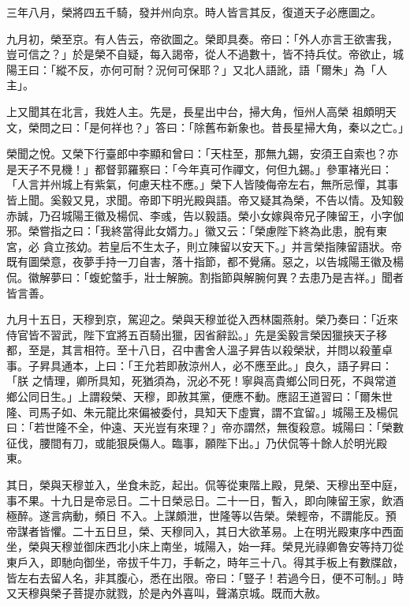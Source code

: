 \begin{pinyinscope}
 三年八月，榮將四五千騎，發并州向京。時人皆言其反，復道天子必應圖之。



 九月初，榮至京。有人告云，帝欲圖之。榮即具奏。帝曰：「外人亦言王欲害我，豈可信之？」於是榮不自疑，每入謁帝，從人不過數十，皆不持兵仗。帝欲止，城陽王曰：「縱不反，亦何可耐？況何可保耶？」又北人語訛，語「爾朱」為「人主」。



 上又聞其在北言，我姓人主。先是，長星出中台，掃大角，恒州人高榮
 祖頗明天文，榮問之曰：「是何祥也？」答曰：「除舊布新象也。昔長星掃大角，秦以之亡。」



 榮聞之悅。又榮下行臺郎中李顯和曾曰：「天柱至，那無九錫，安須王自索也？亦是天子不見機！」都督郭羅察曰：「今年真可作禪文，何但九錫。」參軍褚光曰：「人言并州城上有紫氣，何慮天柱不應。」榮下人皆陵侮帝左右，無所忌憚，其事皆上聞。奚毅又見，求聞。帝即下明光殿與語。帝又疑其為榮，不告以情。及知毅赤誠，乃召城陽王徽及楊侃、李彧，告以毅語。榮小女嫁與帝兄子陳留王，小字伽邪。榮嘗指之曰：「我終當得此女婿力。」徽又云：「榮慮陛下終為此患，脫有東宮，必
 貪立孩幼。若皇后不生太子，則立陳留以安天下。」并言榮指陳留語狀。帝既有圖榮意，夜夢手持一刀自害，落十指節，都不覺痛。惡之，以告城陽王徽及楊侃。徽解夢曰：「蝮蛇螫手，壯士解腕。割指節與解腕何異？去患乃是吉祥。」聞者皆言善。



 九月十五日，天穆到京，駕迎之。榮與天穆並從入西林園燕射。榮乃奏曰：「近來侍官皆不習武，陛下宜將五百騎出獵，因省辭訟。」先是奚毅言榮因獵挾天子移都，至是，其言相符。至十八日，召中書舍人溫子昇告以殺榮狀，并問以殺董卓事。子昇具通本，上曰：「王允若即赦涼州人，必不應至此。」良久，語子昇曰：「朕
 之情理，卿所具知，死猶須為，況必不死！寧與高貴鄉公同日死，不與常道鄉公同日生。」上謂殺榮、天穆，即赦其黨，便應不動。應詔王道習曰：「爾朱世隆、司馬子如、朱元龍比來偏被委付，具知天下虛實，謂不宜留。」城陽王及楊侃曰：「若世隆不全，仲遠、天光豈有來理？」帝亦謂然，無復殺意。城陽曰：「榮數征伐，腰間有刀，或能狠戾傷人。臨事，願陛下出。」乃伏侃等十餘人於明光殿東。



 其日，榮與天穆並入，坐食未訖，起出。侃等從東階上殿，見榮、天穆出至中庭，事不果。十九日是帝忌日。二十日榮忌日。二十一日，暫入，即向陳留王家，飲酒極醉。遂言病動，頻日
 不入。上謀頗泄，世隆等以告榮。榮輕帝，不謂能反。預帝謀者皆懼。二十五日旦，榮、天穆同入，其日大欲革易。上在明光殿東序中西面坐，榮與天穆並御床西北小床上南坐，城陽入，始一拜。榮見光祿卿魯安等持刀從東戶入，即馳向御坐，帝拔千牛刀，手斬之，時年三十八。得其手板上有數牒啟，皆左右去留人名，非其腹心，悉在出限。帝曰：「豎子！若過今日，便不可制。」時又天穆與榮子菩提亦就戮，於是內外喜叫，聲滿京城。既而大赦。




\end{pinyinscope}
